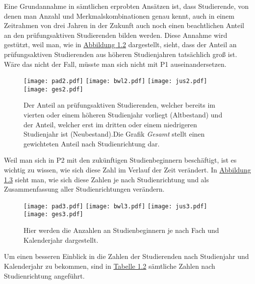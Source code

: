 Eine Grundannahme in s\"amtlichen erprobten Ans\"atzen ist, dass Studierende, von denen man Anzahl und Merkmalskombinationen genau kennt, auch in einem Zeitrahmen von
drei Jahren in der Zukunft auch noch einen beachtlichen Anteil an den pr\"ufungsaktiven Studierenden bilden werden. Diese Annahme wird gest\"utzt, weil man, wie in \hyperref[fig:abb2]{Abbildung 1.2}
dargestellt, sieht, dass der Anteil an pr\"ufungsaktiven Studierenden aus h\"oheren Studienjahren tats\"achlich gro{\ss} ist. W\"are das nicht der Fall, m\"usste man sich nicht mit
P1 auseinandersetzen.

\begin{figure}[ht]
  \label{fig:abb2}
  \texttt{[image: pad2.pdf]}
  \texttt{[image: bwl2.pdf]}
  \texttt{[image: jus2.pdf]}
  \texttt{[image: ges2.pdf]}
  \caption[Anteile des Neu- und Altbestandes an aktiven Studierenden]{Der Anteil an prüfungsaktiven Studierenden, welcher bereits im vierten oder einem höheren
    Studienjahr vorliegt (Altbestand) und der Anteil, welcher erst im dritten oder einem niedrigeren Studienjahr ist (Neubestand).Die Grafik \textit{Gesamt} stellt einen gewichteten
    Anteil nach Studienrichtung dar.}
\end{figure}

Weil man sich in P2 mit den zuk\"unftigen Studienbeginnern besch\"aftigt, ist es wichtig zu wissen, wie sich diese Zahl im Verlauf der Zeit ver\"andert. In
\hyperref[fig:abb3]{Abbildung 1.3} sieht man, wie sich diese Zahlen je nach Studienrichtung und als Zusammenfassung aller Studienrichtungen ver\"andern.

\begin{figure}[ht]
  \label{fig:abb3}
  \texttt{[image: pad3.pdf]}
  \texttt{[image: bwl3.pdf]}
  \texttt{[image: jus3.pdf]}
  \texttt{[image: ges3.pdf]}
  \caption[Anzahl der Studienbeginner nach Fach und Kalenderjahr]{Hier werden die Anzahlen an Studienbeginnern je nach Fach und Kalenderjahr dargestellt.}
\end{figure}

Um einen besseren Einblick in die Zahlen der Studierenden nach Studienjahr und Kalenderjahr zu bekommen, sind in \hyperref[tab:numbers]{Tabelle 1.2} s\"amtliche
Zahlen nach Studienrichtung angef\"uhrt.

